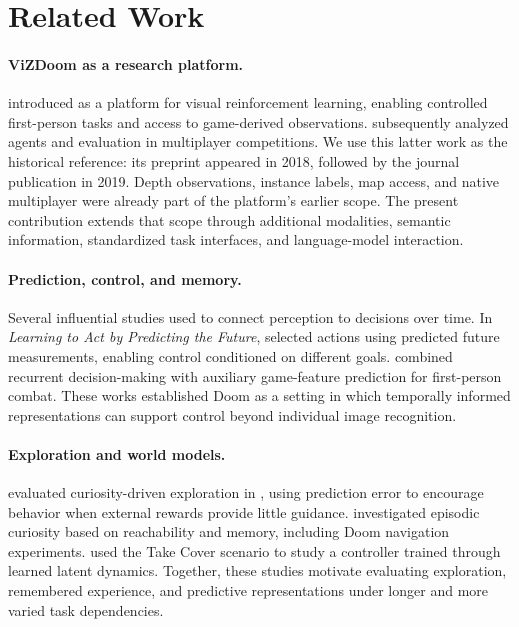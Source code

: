 \section{Related Work}
\label{sec:research}
\paragraph{ViZDoom as a research platform.}
\citet{kempka2016vizdoom} introduced \vzd{} as a platform for visual reinforcement learning, enabling controlled first-person tasks and access to game-derived observations. \citet{wydmuch2019competitions} subsequently analyzed agents and evaluation in multiplayer competitions. We use this latter work as the historical reference: its preprint appeared in 2018, followed by the journal publication in 2019. Depth observations, instance labels, map access, and native multiplayer were already part of the platform's earlier scope. The present contribution extends that scope through additional modalities, semantic information, standardized task interfaces, and language-model interaction.

\paragraph{Prediction, control, and memory.}
Several influential studies used \vzd{} to connect perception to decisions over time. In \emph{Learning to Act by Predicting the Future}, \citet{dosovitskiy2017future} selected actions using predicted future measurements, enabling control conditioned on different goals. \citet{lample2017fps} combined recurrent decision-making with auxiliary game-feature prediction for first-person combat. These works established Doom as a setting in which temporally informed representations can support control beyond individual image recognition.

\paragraph{Exploration and world models.}
\citet{pathak2017curiosity} evaluated curiosity-driven exploration in \vzd{}, using prediction error to encourage behavior when external rewards provide little guidance. \citet{savinov2019episodic} investigated episodic curiosity based on reachability and memory, including Doom navigation experiments. \citet{ha2018worldmodels} used the Take Cover scenario to study a controller trained through learned latent dynamics. Together, these studies motivate evaluating exploration, remembered experience, and predictive representations under longer and more varied task dependencies.

